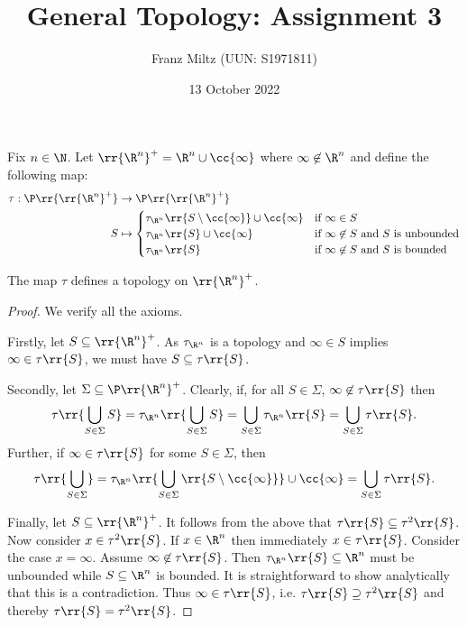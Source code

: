 \documentclass{article}
\begin{document}
\title{General Topology: Assignment 3}
\author{Franz Miltz (UUN: S1971811)}
\date{13 October 2022}
\maketitle

Fix $n\in\N$. Let $\rr{\R^n}^+=\R^n\cup\cc{\infty}$ where $\infty\not\in\R^n$ and define the following map:
\begin{align*}
	\tau:\P\rr{\rr{\R^n}^+} & \to\P\rr{\rr{\R^n}^+}                                                                                                      \\
	S                       & \mapsto \begin{cases}
		                                  \tau_{\R^n}\rr{S\setminus\cc{\infty}}\cup \cc{\infty} & \text{if $\infty\in S$}                          \\
		                                  \tau_{\R^n}\rr{S}\cup\cc{\infty}                      & \text{if $\infty\not\in S$ and $S$ is unbounded} \\
		                                  \tau_{\R^n}\rr{S}                                     & \text{if $\infty\not\in S$ and $S$ is bounded}
	                                  \end{cases}
\end{align*}

\begin{claim*}
	The map $\tau$ defines a topology on $\rr{\R^n}^+$.
	\begin{proof}
		We verify all the axioms.

		Firstly, let $S\subseteq \rr{\R^n}^+$. As $\tau_{\R^n}$ is a topology and $\infty\in S$ implies $\infty\in\tau\rr{S}$,
		we must have $S\subseteq \tau\rr{S}$.

		Secondly, let $\Sigma\subseteq \P\rr{\R^n}^+$. Clearly, if, for all $S\in\Sigma$, $\infty\not\in\tau\rr{S}$ then
		\begin{align*}
			\tau\rr{\bigcup_{S\in\Sigma}S}=\tau_{\R^n}\rr{\bigcup_{S\in\Sigma} S}=\bigcup_{S\in\Sigma}\tau_{\R^n}\rr{S} = \bigcup_{S\in\Sigma}\tau\rr{S}.
		\end{align*}
		Further, if $\infty\in\tau\rr{S}$ for some $S\in\Sigma$, then
		\begin{align*}
			\tau\rr{\bigcup_{S\in\Sigma}} = \tau_{\R^n}\rr{\bigcup_{S\in\Sigma}\rr{S\setminus \cc{\infty}}} \cup \cc{\infty} = \bigcup_{S\in\Sigma}\tau\rr{S}.
		\end{align*}

		Finally, let $S\subseteq\rr{\R^n}^+$. It follows from the above that $\tau\rr{S}\subseteq\tau^2\rr{S}$. Now consider $x\in\tau^2\rr{S}$.
		If $x\in\R^n$ then immediately $x\in\tau\rr{S}$. Consider the case $x=\infty$. Assume $\infty\not\in\tau\rr{S}$. Then
		$\tau_{\R^n}\rr{S}\subseteq\R^n$ must be unbounded while $S\subseteq\R^n$ is bounded. It is straightforward to show analytically that this is
		a contradiction. Thus $\infty\in\tau\rr{S}$, i.e. $\tau\rr{S}\supseteq \tau^2\rr{S}$ and thereby $\tau\rr{S}=\tau^2\rr{S}$.
	\end{proof}
\end{claim*}
\end{document}
